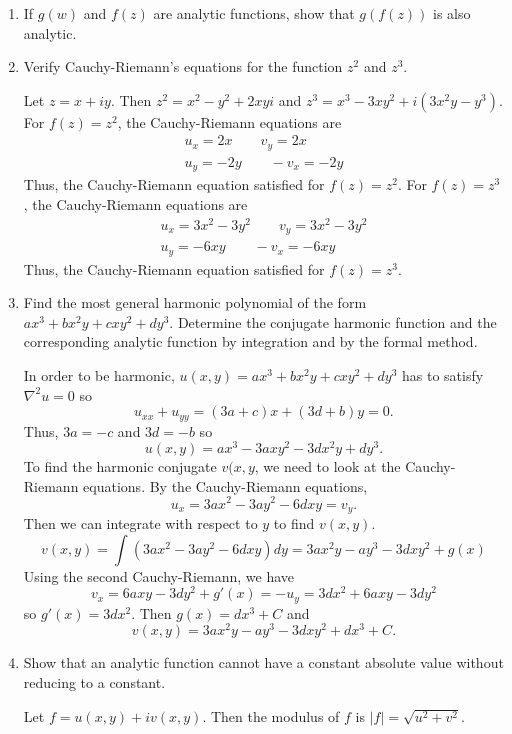 \begin{enumerate}
\item
  If \(g(w)\) and \(f(z)\) are analytic functions, show that \(g(f(z))\) is
  also analytic.
  
\item
  Verify Cauchy-Riemann's equations for the function \(z^2\) and \(z^3\).
  \par\smallskip
  Let \(z = x + iy\).
  Then \(z^2 = x^2 - y^2 + 2xyi\) and
  \(z^3 = x^3 - 3xy^2 + i(3x^2y - y^3)\).
  For \(f(z) = z^2\), the Cauchy-Riemann equations are
  \begin{gather*}
    u_x = 2x \qquad v_y = 2x\\
    u_y = -2y \qquad -v_x = -2y
  \end{gather*}
  Thus, the Cauchy-Riemann equation satisfied for \(f(z) = z^2\).
  For \(f(z) = z^3\), the Cauchy-Riemann equations are
  \begin{gather*}
    u_x = 3x^2 - 3y^2 \qquad v_y = 3x^2 - 3y^2\\
    u_y = -6xy \qquad -v_x = -6xy
  \end{gather*}
  Thus, the Cauchy-Riemann equation satisfied for \(f(z) = z^3\).
\item
  Find the most general harmonic polynomial of the form
  \(ax^3 + bx^2y + cxy^2 + dy^3\).
  Determine the conjugate harmonic function and the corresponding analytic
  function by integration and by the formal method.
  \par\smallskip
  In order to be harmonic, \(u(x,y) = ax^3 + bx^2y + cxy^2 + dy^3\) has to
  satisfy \(\nabla^2u = 0\) so
  \[
  u_{xx} + u_{yy} = (3a + c)x + (3d + b)y = 0.
  \]
  Thus, \(3a = -c\) and \(3d = -b\) so
  \[
  u(x,y) = ax^3 - 3axy^2 - 3dx^2y + dy^3.
  \]
  To find the harmonic conjugate \(v(x,y\), we need to look at the
  Cauchy-Riemann equations.
  By the Cauchy-Riemann equations,
  \[
  u_x = 3ax^2 - 3ay^2 - 6dxy = v_y.
  \]
  Then we can integrate with respect to \(y\) to find \(v(x,y)\).
  \[
  v(x,y) = \int(3ax^2 - 3ay^2 - 6dxy)dy = 3ax^2y - ay^3 - 3dxy^2 + g(x)
  \]
  Using the second Cauchy-Riemann, we have
  \[
  v_x = 6axy - 3dy^2 + g'(x) = -u_y = 3dx^2 + 6axy - 3dy^2
  \]
  so \(g'(x) = 3dx^2\).
  Then \(g(x) = dx^3 + C\) and
  \[
  v(x,y) = 3ax^2y - ay^3 - 3dxy^2 + dx^3 + C.
  \]
\item
  Show that an analytic function cannot have a constant absolute value without
  reducing to a constant.
  \par\smallskip
  Let \(f = u(x,y) + iv(x,y)\).
  Then the modulus of \(f\) is \(\lvert f\rvert = \sqrt{u^2 + v^2}\).

\end{enumerate}

